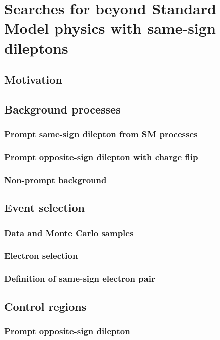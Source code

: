 \chapter{Searches for beyond Standard Model physics with same-sign dileptons}
\label{chap:SS}
\section{Motivation}

\section{Background processes}
\label{sec:wprimeBackgrounds}
\subsection{Prompt same-sign dilepton from SM processes}
\subsection{Prompt opposite-sign dilepton with charge flip}
\subsection{Non-prompt background}

\section{Event selection}
\subsection{Data and Monte Carlo samples}
\subsection{Electron selection}
\subsection{Definition of same-sign electron pair}

\section{Control regions}
\label{sec:wprimeMultijetBackground}
\subsection{Prompt opposite-sign dilepton}
